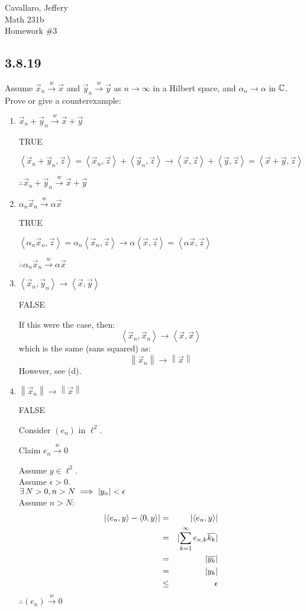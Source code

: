 \documentclass[letterpaper,12pt,fleqn]{article}
\renewcommand{\a}{\alpha}
\newcommand{\e}{\epsilon}
\newcommand{\vx}{\vec{x}}
\newcommand{\vy}{\vec{y}}
\newcommand{\vz}{\vec{z}}
\newcommand{\norm}[1]{\left\|#1\right\|}
\newcommand{\inner}[2]{\left<#1,#2\right>}
\newcommand{\weak}{\overset{w}{\longrightarrow}}
\newcommand{\conj}[1]{\overline{#1}}
\begin{document}
Cavallaro, Jeffery \\
Math 231b \\
Homework \#3

\subsection*{3.8.19}

Assume $\vx_n\weak\vx$ and $\vy_n\weak\vy$ as $n\to\infty$ in a Hilbert space,
and $\a_n\to\a$ in $\mathbb{C}$. Prove or give a counterexample:
\begin{enumerate}[label=(\alph*)]
\item $\vx_n+\vy_n\weak\vx+\vy$

  TRUE

  $\inner{\vx_n+\vy_n}{\vz}=\inner{\vx_n}{\vz}+\inner{\vy_n}{\vz}\to
  \inner{\vx}{\vz}+\inner{\vy}{\vz}=\inner{\vx+\vy}{\vz}$

  $\therefore\vx_n+\vy_n\weak\vx+\vy$

\item $\a_n\vx_n\weak\a\vx$

  TRUE

  $\inner{\a_n\vx_n}{\vz}=\a_n\inner{\vx_n}{\vz}\to\a\inner{\vx}{\vz}=
  \inner{\a\vx}{\vz}$

  $\therefore\a_n\vx_n\weak\a\vx$

\item $\inner{\vx_n}{\vy_n}\to\inner{\vx}{\vy}$

  FALSE

  If this were the case, then:
  \[\inner{\vx_n}{\vx_n}\to\inner{\vx}{\vx}\]
  which is the same (sans squared) as:
  \[\norm{\vx_n}\to\norm{\vx}\]
  However, see (d).

\item $\norm{\vx_n}\to\norm{\vx}$

  FALSE

  Consider $(e_n)$ in $\ell^2$.

  Claim $e_n\weak0$

  Assume $y\in\ell^2$. \\
  Assume $\e>0$. \\
  $\exists\,N>0,n>N\implies\abs{y_n}<\e$ \\
  Assume $n>N$:
  \begin{eqnarray*}
    \abs{\inner{e_n}{y}-\inner{0}{y}} &=& \abs{\inner{e_n}{y}} \\
    &=& \abs{\sum_{k=1}^{\infty}e_{n,k}\conj{k_k}} \\
    &=& \abs{\conj{y_k}} \\
    &=& \abs{y_k} \\
    &\le& \e
  \end{eqnarray*}
  $\therefore(e_n)\weak0$


\end{enumerate}
\end{document}
